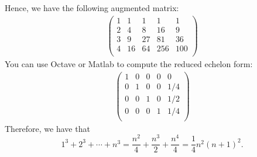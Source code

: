 \documentclass[pdf,9pt]{beamer}
\begin{document}
\begin{frame}[fragile]
    \begin{solution}[continued]
    Hence, we have the following augmented matrix:
    \begin{align*}
	\left(
	    \begin{array}{ cccc|c }
	  1  &    1 &     1  &    1 &    1 \\
	  2  &    4 &     8  &   16 &   9\\
	  3  &    9 &    27  &   81 &   36 \\
	  4  &   16 &    64  &  256 &  100\\
	\end{array}
	\right)
    \end{align*}
    \pause
    You can use Octave or Matlab to compute the reduced echelon form:
    \begin{align*}
	\left(
	\begin{array}{ cccc|c }
	   1 & 0  & 0  & 0  &   0\\
	   0 & 1  & 0  & 0  &  1/4 \\
	   0 & 0  & 1  & 0  &  1/2 \\
	   0 & 0  & 0  & 1  &  1/4 \\
	\end{array}
	\right)
    \end{align*}
    \pause
    Therefore,  we have that
    \[
	1^3 + 2^3 + \cdots + n^3 = \frac{n^2}{4} + \frac{n^3}{2}+\frac{n^4}{4} = \frac{1}{4} n^2(n+1)^2.
    \]
    \myQED
\end{solution}
\end{frame}
\end{document}
